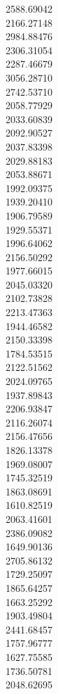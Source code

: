 2588.69042\\
2166.27148\\
2984.88476\\
2306.31054\\
2287.46679\\
3056.28710\\
2742.53710\\
2058.77929\\
2033.60839\\
2092.90527\\
2037.83398\\
2029.88183\\
2053.88671\\
1992.09375\\
1939.20410\\
1906.79589\\
1929.55371\\
1996.64062\\
2156.50292\\
1977.66015\\
2045.03320\\
2102.73828\\
2213.47363\\
1944.46582\\
2150.33398\\
1784.53515\\
2122.51562\\
2024.09765\\
1937.89843\\
2206.93847\\
2116.26074\\
2156.47656\\
1826.13378\\
1969.08007\\
1745.32519\\
1863.08691\\
1610.82519\\
2063.41601\\
2386.09082\\
1649.90136\\
2705.86132\\
1729.25097\\
1865.64257\\
1663.25292\\
1903.49804\\
2441.68457\\
1757.96777\\
1627.75585\\
1736.50781\\
2048.62695\\
